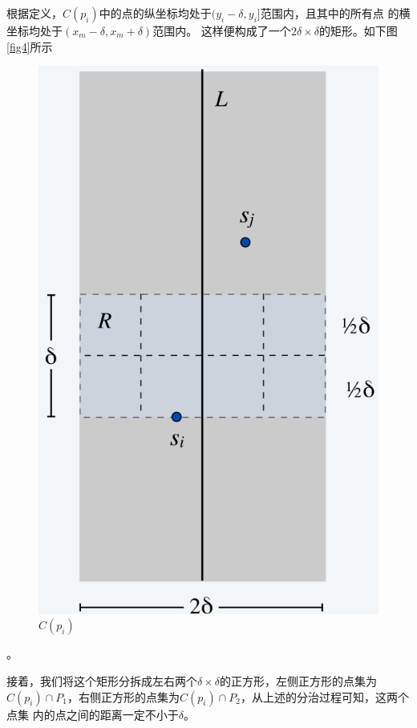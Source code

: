 根据定义，$C(p_i)$中的点的纵坐标均处于$(y_i - \delta, y_i]$范围内，且其中的所有点
的横坐标均处于$\left( x_m - \delta, x_m + \delta \right)$范围内。
这样便构成了一个$2\delta\times\delta$的矩形。如下图\autoref{fig4}所示
\begin{figure}[htb]
    \centering
    \includegraphics[scale=0.5]{Ln9.image/NearestPointsCpi.png}
    \caption{$C(p_i)$}\label{fig4}
\end{figure}。

接着，我们将这个矩形分拆成左右两个$\delta \times \delta$的正方形，左侧正方形的点集为
$C(p_i)\cap P_1$，右侧正方形的点集为$C(p_i)\cap P_2$，从上述的分治过程可知，这两个点集
内的点之间的距离一定不小于$\delta$。

